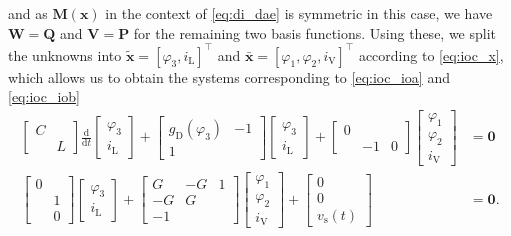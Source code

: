 \documentclass[AMA,STIX1COL]{WileyNJD-v2}
\newcommand{\mb}[1]{\mathbf{#1}}
\newcommand{\mbt}[1]{\tilde{\mathbf{#1}}}
\newcommand{\mbb}[1]{\bar{\mathbf{#1}}}
\newcommand{\mr}[1]{\mathrm{#1}}
\newcommand{\T}{{\!\top}}
\newcommand{\ddt}{\frac{\mathrm{d}}{\mathrm{d}t}}
\begin{document}
and as $\mb{M}(\mb{x})$ in the context of \eqref{eq:di_dae} is symmetric in this case, we have $\mb{W} = \mb{Q}$ and $\mb{V} = \mb{P}$ for the remaining two basis functions. Using these, we split the unknowns into $\mbt{x} = [\varphi_3, i_\mr{L}]^\T$ and $\mbb{x} = [\varphi_1, \varphi_2, i_\mr{V}]^\T$ according to \eqref{eq:ioc_x}, which allows us to obtain the systems corresponding to \eqref{eq:ioc_ioa} and \eqref{eq:ioc_iob}
\begin{subequations}
    \label{eq:itc_ei}
    \begin{align}
        \begin{bmatrix}
            C &\\
            & L
        \end{bmatrix} \ddt \begin{bmatrix}
            \varphi_3\\
            i_\mr{L}
        \end{bmatrix} + \begin{bmatrix}
            g_\mr{D}(\varphi_3) & -1\\
            1 &
        \end{bmatrix} \begin{bmatrix}
            \varphi_3\\
            i_\mr{L}
        \end{bmatrix} + \begin{bmatrix}
            0 & &\\
            & -1 & 0
        \end{bmatrix} \begin{bmatrix}
            \varphi_1\\
            \varphi_2\\
            i_\mr{V}
        \end{bmatrix} &= \mb{0} \label{eq:itc_eia}\\
        \begin{bmatrix}
            0 &\\
            & 1\\
            & 0
        \end{bmatrix} \begin{bmatrix}
            \varphi_3\\
            i_\mr{L}
        \end{bmatrix} + \begin{bmatrix}
            G & -G & 1\\
            -G & G &\\
            -1 & &
        \end{bmatrix} \begin{bmatrix}
            \varphi_1\\
            \varphi_2\\
            i_\mr{V}
        \end{bmatrix} + \begin{bmatrix}
            0\\
            0\\
            v_\mr{s}(t)
        \end{bmatrix} &= \mb{0}. \label{eq:itc_eib}
    \end{align}
\end{subequations}
\end{document}

